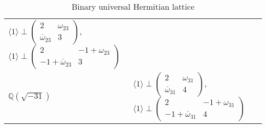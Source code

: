 \documentclass[a4paper,10pt,reqno]{amsart}
\begin{document}
\begin{table}[p]
\begin{tabular}{lll}
${\langle {1} \rangle}\perp{\begin{pmatrix}
  {2} & {\omega_{23}} \\
  {{{{\overline{\omega}}}}_{23}} & 3
\end{pmatrix}}$,
${\langle {1} \rangle}\perp{\begin{pmatrix}
  {2} & {-1+\omega_{23}} \\
  {-1+{{{\overline{\omega}}}}_{23}} & 3
\end{pmatrix}}$ \\
{\rule{0pt}{3ex}}${\mathbb{Q}(\sqrt{{-31}})}$ &
${\langle {1} \rangle}\perp{\begin{pmatrix}
  {2} & {\omega_{31}} \\
  {{{{\overline{\omega}}}}_{31}} & 4
\end{pmatrix}}$,
${\langle {1} \rangle}\perp{\begin{pmatrix}
  {2} & {-1+\omega_{31}} \\
  {-1+{{{\overline{\omega}}}}_{31}} & 4
\end{pmatrix}}$
\\ \hline
\end{tabular} \vspace{2ex}
\caption{Binary universal Hermitian lattice}\label{tbl:binary_universal_Hermitian_lattices}
\end{table}
\end{document}
